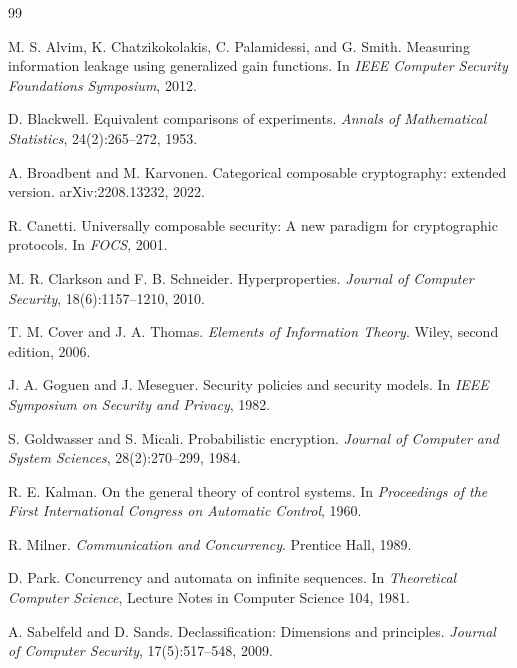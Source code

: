 \documentclass[11pt]{article}
\theoremstyle{definition}
\theoremstyle{plain}
\theoremstyle{remark}
\begin{document}
\begin{thebibliography}{99}

M. S. Alvim, K. Chatzikokolakis, C. Palamidessi, and G. Smith.
\newblock Measuring information leakage using generalized gain functions.
\newblock In \emph{IEEE Computer Security Foundations Symposium}, 2012.

D. Blackwell.
\newblock Equivalent comparisons of experiments.
\newblock \emph{Annals of Mathematical Statistics}, 24(2):265--272, 1953.

A. Broadbent and M. Karvonen.
\newblock Categorical composable cryptography: extended version.
\newblock arXiv:2208.13232, 2022.

R. Canetti.
\newblock Universally composable security: A new paradigm for cryptographic protocols.
\newblock In \emph{FOCS}, 2001.

M. R. Clarkson and F. B. Schneider.
\newblock Hyperproperties.
\newblock \emph{Journal of Computer Security}, 18(6):1157--1210, 2010.

T. M. Cover and J. A. Thomas.
\newblock \emph{Elements of Information Theory}.
\newblock Wiley, second edition, 2006.

J. A. Goguen and J. Meseguer.
\newblock Security policies and security models.
\newblock In \emph{IEEE Symposium on Security and Privacy}, 1982.

S. Goldwasser and S. Micali.
\newblock Probabilistic encryption.
\newblock \emph{Journal of Computer and System Sciences}, 28(2):270--299, 1984.

R. E. Kalman.
\newblock On the general theory of control systems.
\newblock In \emph{Proceedings of the First International Congress on Automatic Control}, 1960.

R. Milner.
\newblock \emph{Communication and Concurrency}.
\newblock Prentice Hall, 1989.

D. Park.
\newblock Concurrency and automata on infinite sequences.
\newblock In \emph{Theoretical Computer Science}, Lecture Notes in Computer Science 104, 1981.

A. Sabelfeld and D. Sands.
\newblock Declassification: Dimensions and principles.
\newblock \emph{Journal of Computer Security}, 17(5):517--548, 2009.


\end{thebibliography}
\end{document}
